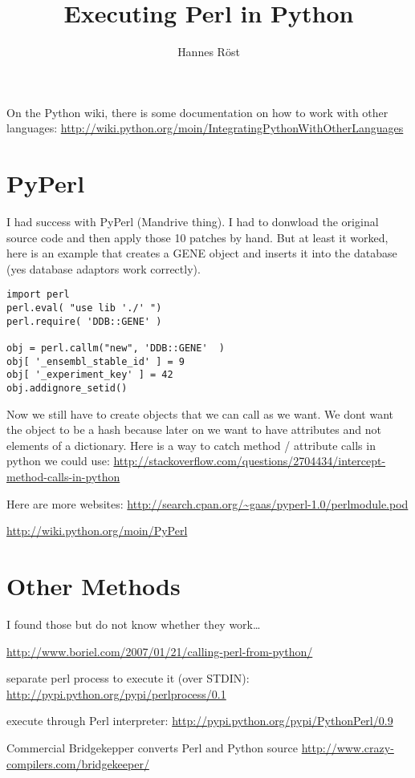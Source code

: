 

\usepackage{gensymb}
\usepackage{hyphenat}
\usepackage{subfig}



\author{Hannes Röst}
\title{Executing Perl in Python}
\maketitle

On the Python wiki, there is some documentation on how to work with
other languages:
\url{http://wiki.python.org/moin/IntegratingPythonWithOtherLanguages}

\section{PyPerl}
I had success with PyPerl (Mandrive thing). I had to donwload the
original source code and then apply those 10 patches by hand. But at
least it worked, here is an example that creates a GENE object and
inserts it into the database (yes database adaptors work correctly).

\begin{verbatim}
import perl
perl.eval( "use lib './' ")
perl.require( 'DDB::GENE' )

obj = perl.callm("new", 'DDB::GENE'  )
obj[ '_ensembl_stable_id' ] = 9
obj[ '_experiment_key' ] = 42
obj.addignore_setid()
\end{verbatim}


Now we still have to create objects that we can call as we want. We dont
want the object to be a hash because later on we want to have attributes
and not elements of a dictionary. Here is a way to catch method /
attribute calls in python we could use:
\url{http://stackoverflow.com/questions/2704434/intercept-method-calls-in-python}

Here are more websites:
\url{http://search.cpan.org/~gaas/pyperl-1.0/perlmodule.pod}

\url{http://wiki.python.org/moin/PyPerl}

\section{Other Methods}
I found those but do not know whether they work\ldots

\url{http://www.boriel.com/2007/01/21/calling-perl-from-python/}

separate perl process to execute it (over STDIN):
\url{http://pypi.python.org/pypi/perlprocess/0.1}

execute through Perl interpreter:
\url{http://pypi.python.org/pypi/PythonPerl/0.9}

Commercial Bridgekepper converts Perl and Python source 
\url{http://www.crazy-compilers.com/bridgekeeper/}

